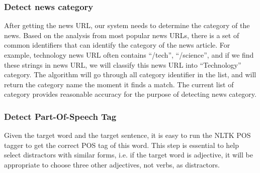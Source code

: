 \subsubsection{Detect news category}
After getting the news URL, our system needs to determine the category of the news. Based on the analysis from most popular news URLs, there is a set of common identifiers that can identify the category of the news article. For example, technology news URL often contains “/tech”, “/science”, and if we find these strings in news URL, we will classify this news URL into “Technology” category. The algorithm will go through all category identifier in the list, and will return the category name the moment it finds a match. The current list of category provides reasonable accuracy for the purpose of detecting news category.
\\
\subsubsection{Detect Part-Of-Speech Tag}
Given the target word and the target sentence, it is easy to run the NLTK POS tagger to get the correct POS tag of this word. This step is essential to help select distractors with similar forms, i.e. if the target word is adjective, it will be appropriate to choose three other adjectives, not verbs, as distractors.
\\
